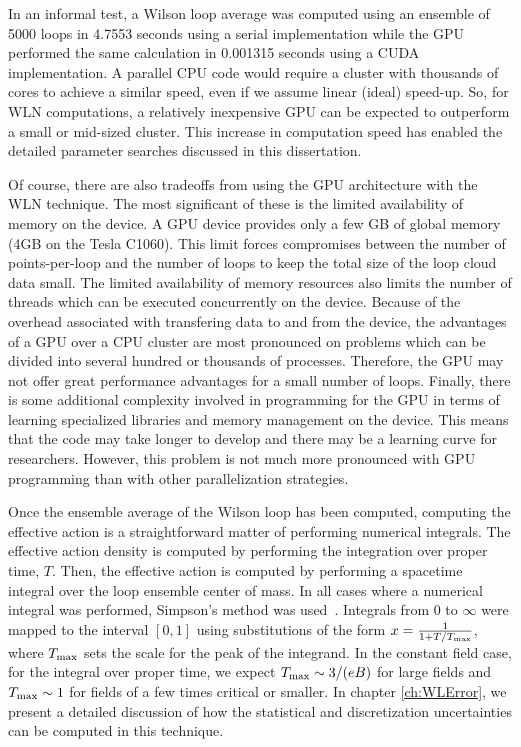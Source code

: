 In an
informal test, a Wilson loop average was computed using an ensemble of 5000
loops in 4.7553 seconds using a serial implementation 
while the \ac{GPU} performed the same calculation
in 0.001315 seconds using a \ac{CUDA} implementation.  
A parallel \ac{CPU} code would require a cluster with thousands of 
cores to achieve a similar speed, even if we assume linear (ideal) 
speed-up.  So, for \ac{WLN} computations,
a relatively inexpensive \ac{GPU} can be expected to outperform a small
or mid-sized cluster.  This increase in computation speed has enabled the
detailed parameter searches discussed in this dissertation.

Of course, there are also tradeoffs from using the 
\ac{GPU} architecture with the \ac{WLN} technique. The most significant 
of these is the limited availability of memory on the device. A \ac{GPU} device 
provides only a few GB of global memory (4GB on the Tesla C1060). This limit 
forces compromises between the number of points-per-loop and the number of 
loops to keep the total size of the loop cloud data small. The limited availability of memory 
resources also limits the number of threads which can be executed concurrently on the device.
Because of the overhead associated with transfering data to and from the device, 
the advantages of a \ac{GPU} over a \ac{CPU} cluster are most pronounced 
on problems which can be divided into several hundred or thousands of processes. 
Therefore, the \ac{GPU} may not offer great performance advantages 
for a small number of loops. Finally, there is some additional complexity involved 
in programming for the \ac{GPU} in terms of learning specialized libraries and 
memory management on the device. This means that the code may take longer to develop
and there may be a learning curve for researchers. However, this problem 
is not much more pronounced with \ac{GPU} programming than with other 
parallelization strategies.

Once the ensemble average of the Wilson loop has been computed, computing
the effective action is a straightforward matter of performing numerical
integrals.  The effective action density is computed by performing the
integration over proper time, $T$.  Then, the effective action is computed
by performing a spacetime integral over the loop ensemble center of mass.
In all cases where a numerical integral was performed, Simpson's method was
used~\cite{burden2001numerical}. Integrals from 0 to $\infty$ were mapped to the 
interval $[0,1]$ using substitutions of the form $x = \frac{1}{1+T/T_{\rm max}}$, 
where $T_{\rm max}$ sets the scale for the peak of the integrand. In the constant field 
case, for the integral over proper time,
 we expect $T_{\rm max} \sim 3/(eB)$ for large fields and $T_{\rm max} \sim 1$ for 
fields of a few times critical or smaller. In chapter \ref{ch:WLError}, we present 
a detailed discussion of how the statistical and discretization uncertainties 
can be computed in this technique.

